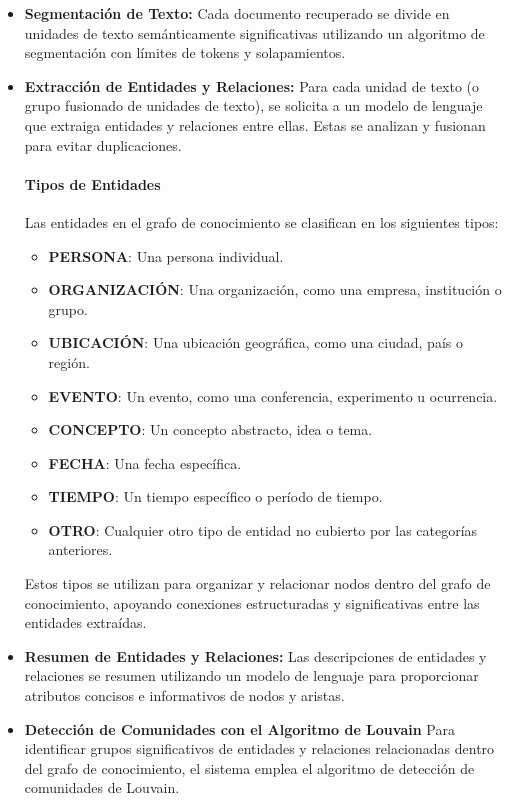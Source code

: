 \documentclass[12pt]{article}
\begin{document}
\begin{itemize}
    \item \textbf{Segmentación de Texto:} Cada documento recuperado se divide en unidades de texto semánticamente significativas utilizando un algoritmo de segmentación con límites de tokens y solapamientos.
    \item \textbf{Extracción de Entidades y Relaciones:} Para cada unidad de texto (o grupo fusionado de unidades de texto), se solicita a un modelo de lenguaje que extraiga entidades y relaciones entre ellas. Estas se analizan y fusionan para evitar duplicaciones.
    \paragraph{Tipos de Entidades}
Las entidades en el grafo de conocimiento se clasifican en los siguientes tipos:
\begin{itemize}
    \item \textbf{PERSONA}: Una persona individual.
    \item \textbf{ORGANIZACIÓN}: Una organización, como una empresa, institución o grupo.
    \item \textbf{UBICACIÓN}: Una ubicación geográfica, como una ciudad, país o región.
    \item \textbf{EVENTO}: Un evento, como una conferencia, experimento u ocurrencia.
    \item \textbf{CONCEPTO}: Un concepto abstracto, idea o tema.
    \item \textbf{FECHA}: Una fecha específica.
    \item \textbf{TIEMPO}: Un tiempo específico o período de tiempo.
    \item \textbf{OTRO}: Cualquier otro tipo de entidad no cubierto por las categorías anteriores.
\end{itemize}
Estos tipos se utilizan para organizar y relacionar nodos dentro del grafo de conocimiento, apoyando conexiones estructuradas y significativas entre las entidades extraídas.

    \item \textbf{Resumen de Entidades y Relaciones:} Las descripciones de entidades y relaciones se resumen utilizando un modelo de lenguaje para proporcionar atributos concisos e informativos de nodos y aristas.
    \item \textbf{Detección de Comunidades con el Algoritmo de Louvain}
Para identificar grupos significativos de entidades y relaciones relacionadas dentro del grafo de conocimiento, el sistema emplea el algoritmo de detección de comunidades de Louvain.


\end{itemize}
\end{document}
